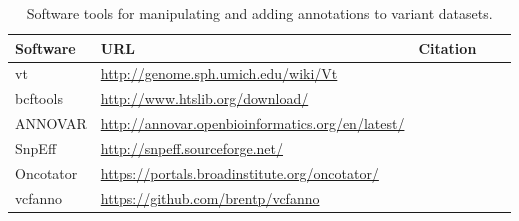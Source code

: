 \documentclass{article}
\begin{document}
 
\begin{table}[p]
\centering
\begin{tabularx}{\textwidth}{p{3cm}XXp{1.5cm}p{1.5cm}}
  \hline
  Software & URL & Citation \\
  \hline
  vt & \url{http://genome.sph.umich.edu/wiki/Vt} & \parencite{Tan2015-dv} \\
  bcftools & \url{http://www.htslib.org/download/} & \parencite{Li2009-du} \\
  ANNOVAR & \url{http://annovar.openbioinformatics.org/en/latest/} & \parencite{Wang2010-bt} \\
  SnpEff & \url{http://snpeff.sourceforge.net/} & \parencite{Cingolani2012-pt} \\
  Oncotator & \url{https://portals.broadinstitute.org/oncotator/} &
  \parencite{Ramos2015-vn} \\
  vcfanno & \url{https://github.com/brentp/vcfanno} &
  \parencite{Pedersen2016-pu} \\
  \hline
\end{tabularx}
\caption{Software tools for manipulating and adding annotations to
  variant datasets.} 
\label{table:4}
\end{table}
\end{document}
